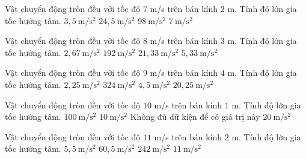 \begin{ex}
Vật chuyển động tròn đều với tốc độ $7$ m/s trên bán kính $2$ m. Tính độ lớn gia tốc hướng tâm.
\choice
{$3,5\ \mathrm{m/s^2}$}
{\True $24,5\ \mathrm{m/s^2}$}
{$98\ \mathrm{m/s^2}$}
{$7\ \mathrm{m/s^2}$}
\end{ex}

\begin{ex}
Vật chuyển động tròn đều với tốc độ $8$ m/s trên bán kính $3$ m. Tính độ lớn gia tốc hướng tâm.
\choice
{$2,67\ \mathrm{m/s^2}$}
{$192\ \mathrm{m/s^2}$}
{\True $21,33\ \mathrm{m/s^2}$}
{$5,33\ \mathrm{m/s^2}$}
\end{ex}

\begin{ex}
Vật chuyển động tròn đều với tốc độ $9$ m/s trên bán kính $4$ m. Tính độ lớn gia tốc hướng tâm.
\choice
{$2,25\ \mathrm{m/s^2}$}
{$324\ \mathrm{m/s^2}$}
{$4,5\ \mathrm{m/s^2}$}
{\True $20,25\ \mathrm{m/s^2}$}
\end{ex}

\begin{ex}
Vật chuyển động tròn đều với tốc độ $10$ m/s trên bán kính $1$ m. Tính độ lớn gia tốc hướng tâm.
\choice
{\True $100\ \mathrm{m/s^2}$}
{$10\ \mathrm{m/s^2}$}
{Không đủ dữ kiện để có giá trị này}
{$20\ \mathrm{m/s^2}$}
\end{ex}

\begin{ex}
Vật chuyển động tròn đều với tốc độ $11$ m/s trên bán kính $2$ m. Tính độ lớn gia tốc hướng tâm.
\choice
{$5,5\ \mathrm{m/s^2}$}
{\True $60,5\ \mathrm{m/s^2}$}
{$242\ \mathrm{m/s^2}$}
{$11\ \mathrm{m/s^2}$}
\end{ex}


